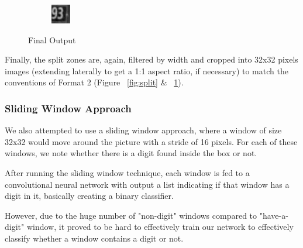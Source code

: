 \documentclass{article} %
\begin{document}
\begin{figure}
\begin{subfigure}{.3\textwidth}
\end{subfigure}
\begin{subfigure}{.3\textwidth}
  \centering
  \includegraphics[width=.8\linewidth]{images/image01}
\end{subfigure}
\caption{Final Output}
\label{fig:output}
\end{figure}

Finally, the split zones are, again, filtered by width and cropped into 32x32 pixels images (extending laterally to get a 1:1 aspect ratio, if necessary) to match the conventions of Format 2 (Figure ~\ref{fig:split} \& ~\ref{fig:output}).

\subsubsection{Sliding Window Approach}
We also attempted to use a sliding window approach, where a window of size 32x32
would move around the picture with a stride of 16 pixels. For each of these windows,
we note whether there is a digit found inside the box or not.

After running the sliding window technique, each window is fed to a convolutional neural network with
output a list indicating if that window has a digit in it, basically creating a binary classifier.

However, due to the huge number of "non-digit" windows compared to "have-a-digit" window, it proved to
be hard to effectively train our network to effectively classify whether a window contains a digit or not.
\end{document}
